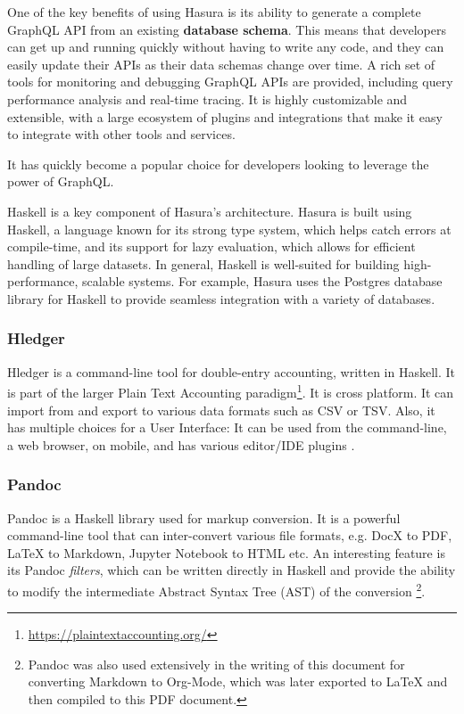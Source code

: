 \documentclass[a4paper, titlepage, twoside]{article}
\begin{document}
One of the key benefits of using Hasura is its ability to generate a complete GraphQL API from an existing \textbf{database schema}. This means that developers can get up and running quickly without having to write any code, and they can easily update their APIs as their data schemas change over time. A rich set of tools for monitoring and debugging GraphQL APIs are provided, including query performance analysis and real-time tracing. It is highly customizable and extensible, with a large ecosystem of plugins and integrations that make it easy to integrate with other tools and services.

It has quickly become a popular choice for developers looking to leverage the power of GraphQL.

Haskell is a key component of Hasura's architecture. Hasura is built using Haskell, a language known for its strong type system, which helps catch errors at compile-time, and its support for lazy evaluation, which allows for efficient handling of large datasets. In general, Haskell is well-suited for building high-performance, scalable systems. For example, Hasura uses the Postgres database library for Haskell to provide seamless integration with a variety of databases.

\subsubsection{Hledger}
\label{sec:orgf4074a5}

Hledger is a command-line tool for double-entry accounting, written in Haskell. It is part of the larger Plain Text Accounting paradigm\footnote{\url{https://plaintextaccounting.org/}}. It is cross platform. It can import from and export to various data formats such as CSV or TSV. Also, it has multiple choices for a User Interface: It can be used from the command-line, a web browser, on mobile, and has various editor/IDE plugins \autocite{michaelHledger2023}.

\subsubsection{Pandoc}
\label{sec:org3f82dd7}

Pandoc is a Haskell library used for markup conversion. It is a powerful command-line tool that can inter-convert various file formats, e.g. DocX to PDF, \LaTeX{} to Markdown, Jupyter Notebook to HTML etc. An interesting feature is its Pandoc \emph{filters}, which can be written directly in Haskell and provide the ability to modify the intermediate Abstract Syntax Tree (AST) of the conversion \autocite{macfarlanePandoc2023}\footnote{Pandoc was also used extensively in the writing of this document for converting Markdown to Org-Mode, which was later exported to \LaTeX{} and then compiled to this PDF document.}.
\end{document}
